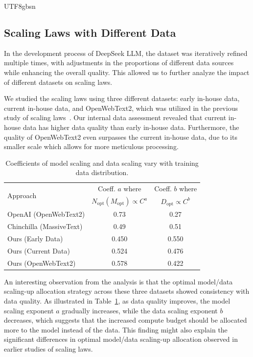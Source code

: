 \documentclass[11pt, a4paper, logo, copyright, nonumbering]{deepseek}
\begin{document}
\begin{CJK*}{UTF8}{gbsn}
\subsection{Scaling Laws with Different Data}

In the development process of DeepSeek LLM, the dataset was iteratively refined multiple times, with adjustments in the proportions of different data sources while enhancing the overall quality.
This allowed us to further analyze the impact of different datasets on scaling laws.

We studied the scaling laws using three different datasets: early in-house data, current in-house data, and OpenWebText2, which was utilized in the previous study of scaling laws~\citep{scalinglaw}. Our internal data assessment revealed that current in-house data has higher data quality than early in-house data. Furthermore, the quality of OpenWebText2 even surpasses the current in-house data, due to its smaller scale which allows for more meticulous processing.

\begin{table}[h]
    \centering
    \begin{tabular}{l|cc}
    \toprule
        \multirow{2}{*}{Approach} & Coeff. $a$ where & Coeff. $b$ where \\
        & $N_{\mathrm{opt}}(M_{\mathrm{opt}}) \propto C^a$ & $D_{\mathrm{opt}} \propto C^b$ \\
    \midrule
        OpenAI (OpenWebText2)    & 0.73 & 0.27 \\
        Chinchilla (MassiveText) & 0.49 & 0.51 \\
    \midrule
        Ours (Early Data)   & 0.450 & 0.550 \\
        Ours (Current Data) & 0.524 & 0.476 \\
        Ours (OpenWebText2) & 0.578 & 0.422 \\
    \bottomrule
    \end{tabular}
    \caption{\centering Coefficients of model scaling and data scaling vary with training data distribution.}
    \label{tab:scaling_allocate_coeff}
\end{table}


An interesting observation from the analysis is that the optimal model/data scaling-up allocation strategy across these three datasets showed consistency with data quality. As illustrated in Table~\ref{tab:scaling_allocate_coeff}, as data quality improves, the model scaling exponent $a$ gradually increases, while the data scaling exponent $b$ decreases, which suggests that the increased compute budget should be allocated more to the model instead of the data. This finding might also explain the significant differences in optimal model/data scaling-up allocation observed in earlier studies of scaling laws.


\end{CJK*}
\end{document}
